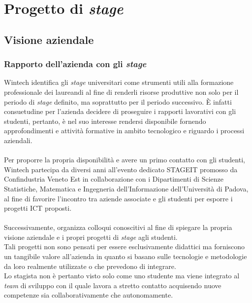\chapter{Progetto di \emph{stage}}
\label{cap:progettoDiStage}

\section{Visione aziendale}
\subsection{Rapporto dell'azienda con gli \emph{stage}}
Wintech identifica gli \emph{stage} universitari come strumenti utili alla formazione professionale dei laureandi al fine di renderli risorse produttive non solo per il periodo di \emph{stage} definito, ma soprattutto per il periodo successivo. È infatti consuetudine per l'azienda decidere di proseguire i rapporti lavorativi con gli studenti, pertanto, è nel suo interesse rendersi disponibile fornendo approfondimenti e attività formative in ambito tecnologico e riguardo i processi aziendali.\\\\
Per proporre la propria disponibilità e avere un primo contatto con gli studenti, Wintech partecipa da diversi anni all'evento dedicato STAGEIT promosso da Confindustria Veneto Est in collaborazione con i Dipartimenti di Scienze Statistiche, Matematica e Ingegneria dell'Informazione dell'Università di Padova, al fine di favorire l'incontro tra aziende associate e gli studenti per esporre i progetti \gls{ICT} proposti.\\\\
Successivamente, organizza colloqui conoscitivi al fine di spiegare la propria visione aziendale e i propri progetti di \emph{stage} agli studenti.\\
Tali progetti non sono pensati per essere esclusivamente didattici ma forniscono un tangibile valore all'azienda in quanto si basano sulle tecnologie e metodologie da loro realmente utilizzate o che prevedono di integrare.\\
Lo stagista non è pertanto visto solo come uno studente ma viene integrato al \emph{team} di sviluppo con il quale lavora a stretto contatto acquisendo nuove competenze sia collaborativamente che autonomamente.\\

